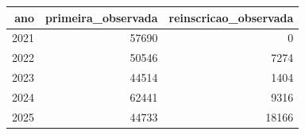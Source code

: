 \begin{tabular}{rrr}
\toprule
ano & primeira_observada & reinscricao_observada \\
\midrule
2021 & 57690 & 0 \\
2022 & 50546 & 7274 \\
2023 & 44514 & 1404 \\
2024 & 62441 & 9316 \\
2025 & 44733 & 18166 \\
\bottomrule
\end{tabular}
